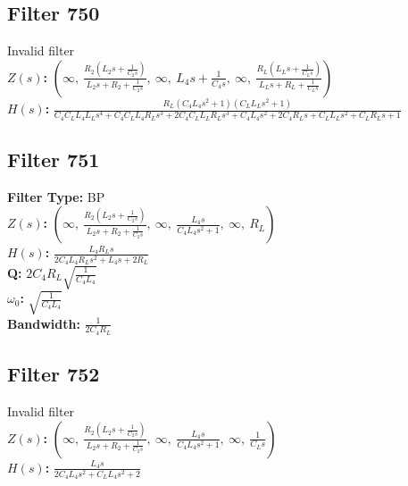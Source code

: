 \documentclass{article}
\begin{document}
\subsection*{Filter 750}
Invalid filter \\ 
\textbf{$Z(s)$:} $\left( \infty, \  \frac{R_{2} \left(L_{2} s + \frac{1}{C_{2} s}\right)}{L_{2} s + R_{2} + \frac{1}{C_{2} s}}, \  \infty, \  L_{4} s + \frac{1}{C_{4} s}, \  \infty, \  \frac{R_{L} \left(L_{L} s + \frac{1}{C_{L} s}\right)}{L_{L} s + R_{L} + \frac{1}{C_{L} s}}\right)$ \\ 
\textbf{$H(s)$:} $\frac{R_{L} \left(C_{4} L_{4} s^{2} + 1\right) \left(C_{L} L_{L} s^{2} + 1\right)}{C_{4} C_{L} L_{4} L_{L} s^{4} + C_{4} C_{L} L_{4} R_{L} s^{3} + 2 C_{4} C_{L} L_{L} R_{L} s^{3} + C_{4} L_{4} s^{2} + 2 C_{4} R_{L} s + C_{L} L_{L} s^{2} + C_{L} R_{L} s + 1}$ \\ 
\subsection*{Filter 751}
\textbf{Filter Type:} BP \\ 
\textbf{$Z(s)$:} $\left( \infty, \  \frac{R_{2} \left(L_{2} s + \frac{1}{C_{2} s}\right)}{L_{2} s + R_{2} + \frac{1}{C_{2} s}}, \  \infty, \  \frac{L_{4} s}{C_{4} L_{4} s^{2} + 1}, \  \infty, \  R_{L}\right)$ \\ 
\textbf{$H(s)$:} $\frac{L_{4} R_{L} s}{2 C_{4} L_{4} R_{L} s^{2} + L_{4} s + 2 R_{L}}$ \\ 
\textbf{Q:} $2 C_{4} R_{L} \sqrt{\frac{1}{C_{4} L_{4}}}$ \\ 
\textbf{$\omega_0$:} $\sqrt{\frac{1}{C_{4} L_{4}}}$ \\ 
\textbf{Bandwidth:} $\frac{1}{2 C_{4} R_{L}}$ \\ 
\subsection*{Filter 752}
Invalid filter \\ 
\textbf{$Z(s)$:} $\left( \infty, \  \frac{R_{2} \left(L_{2} s + \frac{1}{C_{2} s}\right)}{L_{2} s + R_{2} + \frac{1}{C_{2} s}}, \  \infty, \  \frac{L_{4} s}{C_{4} L_{4} s^{2} + 1}, \  \infty, \  \frac{1}{C_{L} s}\right)$ \\ 
\textbf{$H(s)$:} $\frac{L_{4} s}{2 C_{4} L_{4} s^{2} + C_{L} L_{4} s^{2} + 2}$ \\ 
\end{document}
